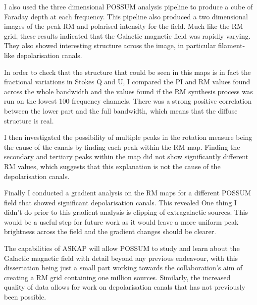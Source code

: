I also used the three dimensional POSSUM analysis pipeline to produce a cube of Faraday depth at each frequency. This pipeline also produced a two dimensional images of the peak RM and polarised intensity for the field. Much like the RM grid, these results indicated that the Galactic magnetic field was rapidly varying. They also showed interesting structure across the image, in particular filament-like depolarisation canals.

In order to check that the structure that could be seen in this maps is in fact the fractional variations in Stokes Q and U, I compared the PI and RM values found across the whole bandwidth and the values found if the RM synthesis process was run on the lowest 100 frequency channels. There was a strong positive correlation between the lower part and the full bandwidth, which means that the diffuse structure is real. 

I then investigated the possibility of multiple peaks in the rotation measure being the cause of the canals by finding each peak within the RM map. Finding the secondary and tertiary peaks within the map did not show significantly different RM values, which suggests that this explanation is not the cause of the depolarisation canals. 

Finally I conducted a gradient analysis on the RM maps for a different POSSUM field that showed significant depolarisation canals. This revealed One thing I didn't do prior to this gradient analysis is clipping of extragalactic sources. This would be a useful step for future work as it would leave a more uniform peak brightness across the field and the gradient changes should be clearer.

The capabilities of ASKAP will allow POSSUM to study and learn about the Galactic magnetic field with detail beyond any previous endeavour, with this dissertation being just a small part working towards the collaboration's aim of creating a RM grid containing one million sources. Similarly, the increased quality of data allows for work on depolarisation canals that has not previously been possible.